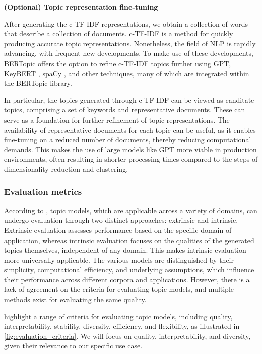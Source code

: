 \documentclass{article}
\begin{document}
\textbf{(Optional) Topic representation fine-tuning}

After generating the c-TF-IDF representations, we obtain a collection of words that describe a collection of documents. c-TF-IDF is a method for quickly producing accurate topic representations. Nonetheless, the field of NLP is rapidly advancing, with frequent new developments. To make use of these developments, BERTopic offers the option to refine c-TF-IDF topics further using GPT, KeyBERT \cite{grootendorst_maartengrkeybert_2024}, spaCy \cite{noauthor_explosionspacy_nodate}, and other techniques, many of which are integrated within the BERTopic library.

In particular, the topics generated through c-TF-IDF can be viewed as canditate topics, comprising a set of keywords and representative documents. These can serve as a foundation for further refinement of topic representations. The availability of representative documents for each topic can be useful, as it enables fine-tuning on a reduced number of documents, thereby reducing computational demands. This makes the use of large models like GPT more viable in production environments, often resulting in shorter processing times compared to the steps of dimensionality reduction and clustering.

\subsubsection{Evaluation metrics}

According to \citet{abdelrazek_topic_2022}, topic models, which are applicable across a variety of domains, can undergo evaluation through two distinct approaches: extrinsic and intrinsic. Extrinsic evaluation assesses performance based on the specific domain of application, whereas intrinsic evaluation focuses on the qualities of the generated topics themselves, independent of any domain. This makes intrinsic evaluation more universally applicable. The various models are distinguished by their simplicity, computational efficiency, and underlying assumptions, which influence their performance across different corpora and applications. However, there is a lack of agreement on the criteria for evaluating topic models, and multiple methods exist for evaluating the same quality.

\citet{abdelrazek_topic_2022} highlight a range of criteria for evaluating topic models, including quality, interpretability, stability, diversity, efficiency, and flexibility, as illustrated in \cref{fig:evaluation_criteria}. We will focus on quality, interpretability, and diversity, given their relevance to our specific use case.
\end{document}
